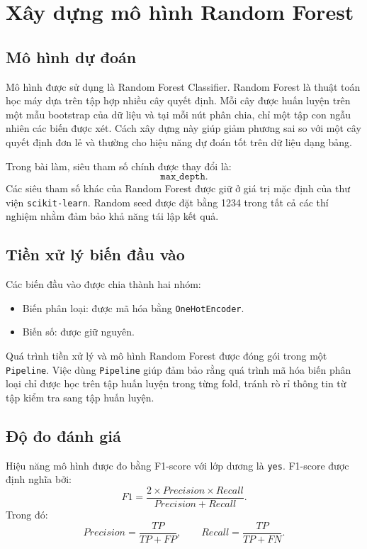 \documentclass[12pt,a4paper]{article}
\begin{document}
\section{Xây dựng mô hình Random Forest}

\subsection{Mô hình dự đoán}

Mô hình được sử dụng là Random Forest Classifier. Random Forest là thuật toán học máy dựa trên tập hợp nhiều cây quyết định. Mỗi cây được huấn luyện trên một mẫu bootstrap của dữ liệu và tại mỗi nút phân chia, chỉ một tập con ngẫu nhiên các biến được xét. Cách xây dựng này giúp giảm phương sai so với một cây quyết định đơn lẻ và thường cho hiệu năng dự đoán tốt trên dữ liệu dạng bảng.

Trong bài làm, siêu tham số chính được thay đổi là:
\[
\texttt{max\_depth}.
\]
Các siêu tham số khác của Random Forest được giữ ở giá trị mặc định của thư viện \texttt{scikit-learn}. Random seed được đặt bằng 1234 trong tất cả các thí nghiệm nhằm đảm bảo khả năng tái lập kết quả.

\subsection{Tiền xử lý biến đầu vào}

Các biến đầu vào được chia thành hai nhóm:
\begin{itemize}
    \item Biến phân loại: được mã hóa bằng \texttt{OneHotEncoder}.
    \item Biến số: được giữ nguyên.
\end{itemize}

Quá trình tiền xử lý và mô hình Random Forest được đóng gói trong một \texttt{Pipeline}. Việc dùng \texttt{Pipeline} giúp đảm bảo rằng quá trình mã hóa biến phân loại chỉ được học trên tập huấn luyện trong từng fold, tránh rò rỉ thông tin từ tập kiểm tra sang tập huấn luyện.

\subsection{Độ đo đánh giá}

Hiệu năng mô hình được đo bằng F1-score với lớp dương là \texttt{yes}. F1-score được định nghĩa bởi:
\[
F1 = \frac{2 \times Precision \times Recall}{Precision + Recall}.
\]
Trong đó:
\[
Precision = \frac{TP}{TP + FP}, \qquad Recall = \frac{TP}{TP + FN}.
\]
\end{document}
